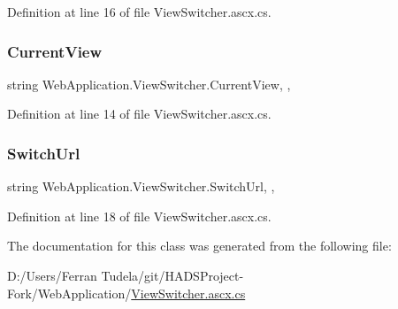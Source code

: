 Definition at line 16 of file View\+Switcher.\+ascx.\+cs.

\mbox{\label{classWebApplication_1_1ViewSwitcher_a65a2e1bbc4abb8488ed59abc6904f47a}} 
\subsubsection{\texorpdfstring{CurrentView}{CurrentView}}
{\footnotesize\ttfamily string Web\+Application.\+View\+Switcher.\+Current\+View\hspace{0.3cm}{\ttfamily [get]}, {}, {\ttfamily [protected]}}



Definition at line 14 of file View\+Switcher.\+ascx.\+cs.

\mbox{\label{classWebApplication_1_1ViewSwitcher_aa6e83ed2a4b0c20c680600d42d3aed05}} 
\subsubsection{\texorpdfstring{SwitchUrl}{SwitchUrl}}
{\footnotesize\ttfamily string Web\+Application.\+View\+Switcher.\+Switch\+Url\hspace{0.3cm}{\ttfamily [get]}, {}, {\ttfamily [protected]}}



Definition at line 18 of file View\+Switcher.\+ascx.\+cs.



The documentation for this class was generated from the following file\+:\begin{DoxyCompactItemize}
\item 
D\+:/\+Users/\+Ferran Tudela/git/\+H\+A\+D\+S\+Project-\/\+Fork/\+Web\+Application/\mbox{\hyperlink{ViewSwitcher_8ascx_8cs}{View\+Switcher.\+ascx.\+cs}}\end{DoxyCompactItemize}

